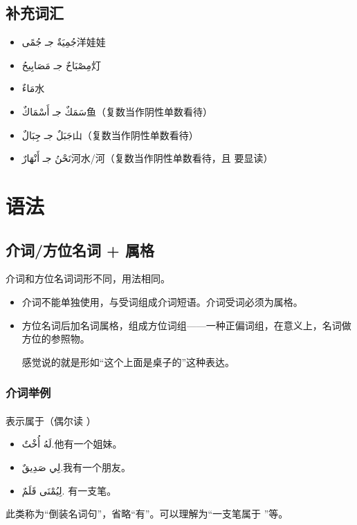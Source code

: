 \subsection{补充词汇}

\begin{itemize}
    \item \ac{جُمِيَةٌ جـ جُمًى}{洋娃娃}
    \item \ac{مِصْبَاحٌ جـ مَصَابِيحُ}{灯}
    \item \ac{مَاءٌ}{水}
    \item \ac{سَمَكٌ جـ أَسْمَاكٌ}{鱼（复数当作阴性单数看待）}
    \item \ac{جَبَلٌ جـ جِبَالٌ}{山（复数当作阴性单数看待）}
    \item \ac{نَحْنُ جـ أَنْهَارٌ}{河水/河（复数当作阴性单数看待，且  要显读）}
\end{itemize}

\section{语法}

\subsection{ 介词/方位名词 + 属格}

介词和方位名词词形不同，用法相同。

\begin{itemize}
    \item 介词不能单独使用，与受词组成介词短语。介词受词必须为属格。
    \item 方位名词后加名词属格，组成方位词组——一种正偏词组，在意义上，名词做方位的参照物。
    \begin{note}
    感觉说的就是形如``这个上面是桌子的''这种表达。
    \end{note}
\end{itemize}

\subsubsection{介词举例}

\paragraph{} 表示属于（偶尔读  ）

\begin{itemize}
    \item \ac{لَهُ أُخْتٌ.}{他有一个姐妹。}
    \item \ac{لِي صَدِيقٌ.}{我有一个朋友。}
    \item \ac{لِيُمْنَى قَلَمٌ.}{  有一支笔。}
\end{itemize}
\begin{attention}
    此类称为``倒装名词句''，省略``有''。可以理解为``一支笔属于  ''等。
\end{attention}

